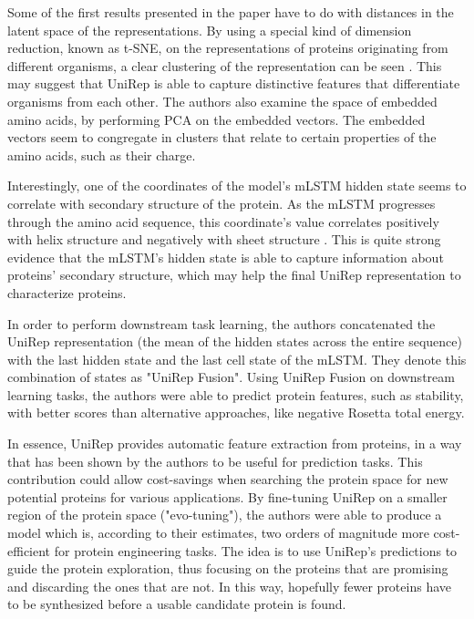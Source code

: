 \documentclass[a4paper,12pt]{article}
\begin{document}
Some of the first results presented in the paper have to do with distances in the latent space of the representations. By using a special kind of dimension reduction, known as t-SNE, on the representations of proteins originating from different organisms, a clear clustering of the representation can be seen \cite[fig. 2b]{alley2019unified}. This may suggest that UniRep is able to capture distinctive features that differentiate organisms from each other. The authors also examine the space of embedded amino acids, by performing PCA on the embedded vectors. The embedded vectors seem to congregate in clusters that relate to certain properties of the amino acids, such as their charge.

Interestingly, one of the coordinates of the model's mLSTM hidden state seems to correlate with secondary structure of the protein. As the mLSTM progresses through the amino acid sequence, this coordinate's value correlates positively with helix structure and negatively with sheet structure \cite[fig. 2e]{alley2019unified}. This is quite strong evidence that the mLSTM's hidden state is able to capture information about proteins' secondary structure, which may help the final UniRep representation to characterize proteins.

In order to perform downstream task learning, the authors concatenated the UniRep representation (the mean of the hidden states across the entire sequence) with the last hidden state and the last cell state of the mLSTM. They denote this combination of states as "UniRep Fusion". Using UniRep Fusion on downstream learning tasks, the authors were able to predict protein features, such as stability, with better scores than alternative approaches, like negative Rosetta total energy.

In essence, UniRep provides automatic feature extraction from proteins, in a way that has been shown by the authors to be useful for prediction tasks. This contribution could allow cost-savings when searching the protein space for new potential proteins for various applications. By fine-tuning UniRep on a smaller region of the protein space ("evo-tuning"), the authors were able to produce a model which is, according to their estimates, two orders of magnitude more cost-efficient for protein engineering tasks. The idea is to use UniRep's predictions to guide the protein exploration, thus focusing on the proteins that are promising and discarding the ones that are not. In this way, hopefully fewer proteins have to be synthesized before a usable candidate protein is found.
\end{document}
